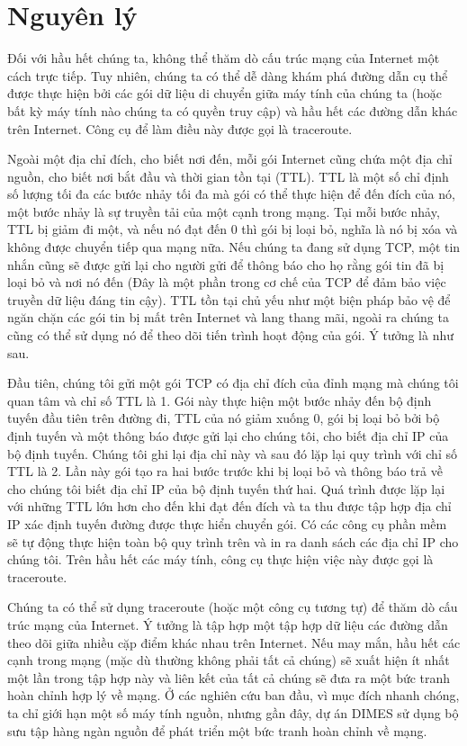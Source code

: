 \section{Nguyên lý}
Đối với hầu hết chúng ta, không thể thăm dò cấu trúc mạng của Internet một cách trực tiếp. Tuy nhiên, chúng ta có thể dễ dàng khám phá đường dẫn cụ thể được thực hiện bởi các gói dữ liệu di chuyển giữa máy tính của chúng ta (hoặc bất kỳ máy tính nào chúng ta có quyền truy cập) và hầu hết các đường dẫn khác trên Internet. Công cụ để làm điều này được gọi là traceroute.\par
Ngoài một địa chỉ đích, cho biết nơi đến, mỗi gói Internet cũng chứa một địa chỉ nguồn, cho biết nơi bắt đầu và thời gian tồn tại (TTL). TTL là một số chỉ định số lượng tối đa các bước nhảy tối đa mà gói có thể thực hiện để đến đích của nó, một bước nhảy là sự truyền tải của một cạnh trong mạng. Tại mỗi bước nhảy, TTL bị giảm đi một, và nếu nó đạt đến 0 thì gói bị loại bỏ, nghĩa là nó bị xóa và không được chuyển tiếp qua mạng nữa. Nếu chúng ta đang sử dụng TCP, một tin nhắn cũng sẽ được gửi lại cho người gửi để thông báo cho họ rằng gói tin đã bị loại bỏ và nơi nó đến (Đây là một phần trong cơ chế của TCP để đảm bảo việc truyền dữ liệu đáng tin cậy). TTL tồn tại chủ yếu như một biện pháp bảo vệ để ngăn chặn các gói tin bị mất trên Internet và lang thang mãi, ngoài ra chúng ta cũng có thể sử dụng nó để theo dõi tiến trình hoạt động của gói. Ý tưởng là như sau.\par
Đầu tiên, chúng tôi gửi một gói TCP có địa chỉ đích của đỉnh mạng mà chúng tôi quan tâm và chỉ số TTL là 1. Gói này thực hiện một bước nhảy đến bộ định tuyến đầu tiên trên đường đi, TTL của nó giảm xuống 0, gói bị loại bỏ bởi bộ định tuyến và một thông báo được gửi lại cho chúng tôi, cho biết địa chỉ IP của bộ định tuyến. Chúng tôi ghi lại địa chỉ này và sau đó lặp lại quy trình với chỉ số TTL là 2. Lần này gói tạo ra hai bước trước khi bị loại bỏ và thông báo trả về cho chúng tôi biết địa chỉ IP của bộ định tuyến thứ hai. Quá trình được lặp lại với những TTL lớn hơn cho đến khi đạt đến đích và ta thu được tập hợp địa chỉ IP xác định tuyến đường được thực hiển chuyển gói. Có các công cụ phần mềm sẽ tự động thực hiện toàn bộ quy trình trên và in ra danh sách các địa chỉ IP cho chúng tôi. Trên hầu hết các máy tính, công cụ thực hiện việc này được gọi là traceroute.\par
Chúng ta có thể sử dụng traceroute (hoặc một công cụ tương tự) để thăm dò cấu trúc mạng của Internet. Ý tưởng là tập hợp một tập hợp dữ liệu các đường dẫn theo dõi giữa nhiều cặp điểm khác nhau trên Internet. Nếu may mắn, hầu hết các cạnh trong mạng (mặc dù thường không phải tất cả chúng) sẽ xuất hiện ít nhất một lần trong tập hợp này và liên kết của tất cả chúng sẽ đưa ra một bức tranh hoàn chỉnh hợp lý về mạng. Ở các nghiên cứu ban đầu, vì mục đích nhanh chóng, ta chỉ giới hạn một số máy tính nguồn, nhưng gần đây, dự án DIMES sử dụng bộ sưu tập hàng ngàn nguồn để phát triển một bức tranh hoàn chỉnh về mạng.\par
